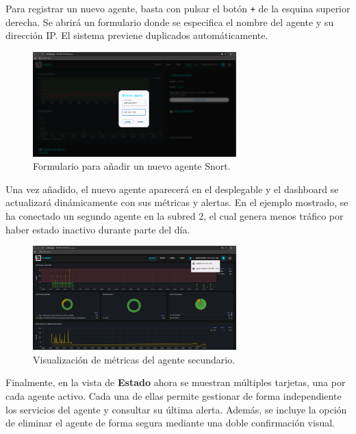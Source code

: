 \documentclass[11pt,a4paper,twoside]{report}
\begin{document}
Para registrar un nuevo agente, basta con pulsar el botón \texttt{+} de la esquina superior derecha. Se abrirá un formulario donde se especifica el nombre del agente y su dirección IP. El sistema previene duplicados automáticamente.

\begin{figure}[H]
	\centering
	\includegraphics[width=0.7\textwidth]{configuracion/8.png}
	\caption{Formulario para añadir un nuevo agente Snort.}
	\label{fig:agregar-agente}
\end{figure}

Una vez añadido, el nuevo agente aparecerá en el desplegable y el dashboard se actualizará dinámicamente con sus métricas y alertas. En el ejemplo mostrado, se ha conectado un segundo agente en la subred 2, el cual genera menos tráfico por haber estado inactivo durante parte del día.

\begin{figure}[H]
	\centering
	\includegraphics[width=0.7\textwidth]{configuracion/9.png}
	\caption{Visualización de métricas del agente secundario.}
	\label{fig:dashboard-agente-secundario}
\end{figure}

\newpage

Finalmente, en la vista de \textbf{Estado} ahora se muestran múltiples tarjetas, una por cada agente activo. Cada una de ellas permite gestionar de forma independiente los servicios del agente y consultar su última alerta. Además, se incluye la opción de eliminar el agente de forma segura mediante una doble confirmación visual.
\end{document}
